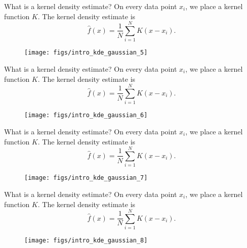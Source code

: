 \documentclass[11pt, aspectratio=149]{beamer}
\theoremstyle{plain}
\begin{document}
\begin{frame}[fragile, t]{What is a kernel density estimate?}
	On every data point $x_i$, we place a kernel function $K$.
	The kernel density estimate is 
	\begin{equation*}
	\hat{f}(x) = \frac{1}{N} \sum_{i=1}^{N} K(x - x_i).
	\end{equation*}
	\vfill
	\begin{figure}
		\centering
		\texttt{[image: figs/intro\_kde\_gaussian\_5]}
	\end{figure}
\end{frame}


\begin{frame}[fragile, t]{What is a kernel density estimate?}
	On every data point $x_i$, we place a kernel function $K$.
	The kernel density estimate is 
	\begin{equation*}
	\hat{f}(x) = \frac{1}{N} \sum_{i=1}^{N} K(x - x_i).
	\end{equation*}
	\vfill
	\begin{figure}
		\centering
		\texttt{[image: figs/intro\_kde\_gaussian\_6]}
	\end{figure}
\end{frame}


\begin{frame}[fragile, t]{What is a kernel density estimate?}
	On every data point $x_i$, we place a kernel function $K$.
	The kernel density estimate is 
	\begin{equation*}
	\hat{f}(x) = \frac{1}{N} \sum_{i=1}^{N} K(x - x_i).
	\end{equation*}
	\vfill
	\begin{figure}
		\centering
		\texttt{[image: figs/intro\_kde\_gaussian\_7]}
	\end{figure}
\end{frame}


\begin{frame}[fragile, t]{What is a kernel density estimate?}
	On every data point $x_i$, we place a kernel function $K$.
	The kernel density estimate is 
	\begin{equation*}
	\hat{f}(x) = \frac{1}{N} \sum_{i=1}^{N} K(x - x_i).
	\end{equation*}
	\vfill
	\begin{figure}
		\centering
		\texttt{[image: figs/intro\_kde\_gaussian\_8]}
	\end{figure}
\end{frame}
\end{document}

